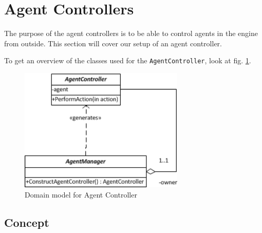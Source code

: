 
\section{Agent Controllers\label{sec:SystemFeaturesAgentControllers}}

The purpose of the agent controllers is to be able to control agents
in the engine from outside. This section will cover our setup of an
agent controller. 

To get an overview of the classes used for the \texttt{AgentController},
look at fig. \ref{fig:AgentControllerDomainModel}.

\begin{figure}
\begin{centering}
\includegraphics[width=0.7\textwidth]{AgentControllerDomainUML}
\par\end{centering}

\caption{Domain model for Agent Controller\label{fig:AgentControllerDomainModel}}
\end{figure}



\subsection{Concept}

